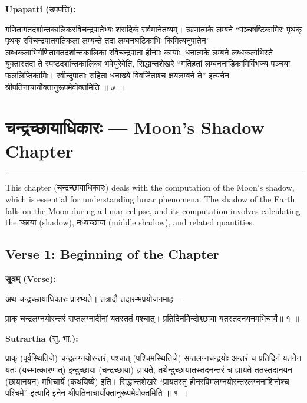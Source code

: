 \documentclass[11pt,a4paper]{article}
\newcommand{\dev}[1]{{\devanagarifont #1}}
\newcommand{\arth}{\textbf{Sūtrārtha (}\dev{सु. भा.}\textbf{):}\ }
\newcommand{\upapatti}{\textbf{Upapatti (}\dev{उपपत्ति}\textbf{):}\ }
\newenvironment{sanskritverse}{%
  \begin{center}\begin{minipage}{0.9\textwidth}
  \setlength{\leftskip}{1em}
  \setlength{\rightskip}{1em}
  \dev
}{\end{minipage}\end{center}}
\begin{document}
\noindent\upapatti
\begin{sanskritverse}
गणितागतदर्शान्तकालिकरविचन्द्रपातेभ्यः शरादिकं सर्वमानेतव्यम्। ऋणात्मके
लम्बने ``पञ्चषष्टिकामिरः पृथक् पृथक् रविचन्द्रपातगतिकला लम्यन्ते तदा
लम्बनघटिकाभिः किमित्यनुपातेन'' लब्धकलाभिर्गणितागतदर्शान्तकालिका
रविचन्द्रपाता हीनााः कार्याः, धनात्मके लम्बने लब्धकलाभिस्ते युक्तास्तदा ते
स्पष्टदर्शान्तकालिका भवेयुरेवेति, सिद्धान्तशेखरे ``गतिहतां लम्बननाडिकामिर्विभज्य
पञ्चया फललिप्तिकामिः। रवीन्दुपाताः सहिता धनाख्ये विवर्जिताश्च क्षयलम्बने ते''
इत्यनेन श्रीपतिनाचार्योक्तानुरूपमेवोक्तमिति ॥ ७ ॥
\end{sanskritverse}


\newpage
\section{\dev{चन्द्रच्छायाधिकारः} — Moon's Shadow Chapter}
\label{sec:chandra-chhaya}

\begin{center}
\textcolor{rulecolor}{\rule{0.8\textwidth}{0.5pt}}
\end{center}

This chapter (\dev{चन्द्रच्छायाधिकारः}) deals with the computation of the Moon's
shadow, which is essential for understanding lunar phenomena. The shadow of the
Earth falls on the Moon during a lunar eclipse, and its computation involves
calculating the \dev{च्छाया} (shadow), \dev{मध्यच्छाया} (middle shadow), and related
quantities.

\subsection{Verse 1: Beginning of the Chapter}

\vspace{0.5em}
\noindent\textbf{\dev{सूत्रम् (Verse):}}
\begin{sanskritverse}
अथ चन्द्रच्छायाधिकारः प्रारभ्यते। तत्रादौ तदारम्भप्रयोजनमाह—
\end{sanskritverse}

\begin{sanskritverse}
प्राक् चन्द्रलग्नयोरन्तरं सप्तलग्नादीनां यतस्ततं पश्चात्।
प्रतिदिनमिन्दोश्च्छाया यतस्तदनयनमभिचार्ये॥ १ ॥
\end{sanskritverse}

\noindent\arth
\begin{sanskritverse}
प्राक् (पूर्वस्थितिजे) चन्द्रलग्नयोरन्तरं, पश्चात् (पश्चिमस्थितिजे) सप्तलग्नचन्द्रयोः
अन्तरं च प्रतिदिनं यतनेन यतः (यस्मात्कारणात्) इन्दुच्छाया (चन्द्रच्छाया) ज्ञायते,
तथेन्दुच्छायातस्तदनन्तरं च ज्ञायते ततस्तदानयन (छायानयन) मभिचार्ये (कथयिष्ये) इति।
सिद्धान्तशेखरे ``प्रायतस्तु हीनरविमलग्नयोरन्तरलग्ननाशिनोश्च पश्चिमे'' इत्यादि
इनेन श्रीपतिनाचार्योक्तानुरूपमेवोक्तमिति ॥ १ ॥
\end{sanskritverse}
\end{document}
